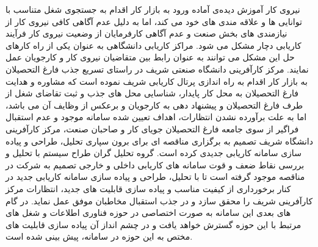 نیروی کار آموزش دیده‌ی آماده ورود به بازار کار اقدام به جستجوی شغل متناسب با توانایی ها و علاقه مندی های خود می کند، اما به دلیل عدم آگاهی کافی نیروی کار از نیازمندی های بخش صنعت و عدم آگاهی کارفرمایان از وضعیت نیروی کار فرآیند کاریابی دچار مشکل می شود. مراکز کاریابی دانشگاهی به عنوان یکی از راه کارهای حل این مشکل می توانند به عنوان رابط بین متقاضیان نیروی کار و کارجویان عمل نمایند. مرکز کارآفرینی دانشگاه صنعتی شریف در راستای تسریع جذب فارغ التحصیلان به بازار کار اقدام به راه اندازی پرتال کاریابی شریف نموده است که مشاوره و هدایت فارغ التحصیلان به محل کار پایدار، شناسایی محل های جذب و ثبت تقاضای شغل از طرف فارغ التحصیلان و پیشنهاد دهی به کارجویان و برعکس از وظایف آن می باشد، اما به علت برآورده نشدن انتظارات، اهداف تعیین شده سامانه موجود و عدم استقبال فراگیر از سوی جامعه فارغ التحصیلان جویای کار و صاحبان صنعت، مرکز کارآفرینی دانشگاه شریف تصمیم به برگزاری مناقصه ای برای برون سپاری تحلیل، طراحی و پیاده سازی سامانه کاریابی جدیدی کرده است.  گروه تحلیل گران طراح سیستم با تحلیل و بررسی نقاط ضعف و قوت سامانه های کاریابی داخلی و خارجی تصمیم به شرکت در مناقصه موجود گرفته است تا با تحلیل، طراحی و پیاده سازی سامانه کاریابی جدید در کنار برخورداری از کیفیت مناسب و پیاده سازی قابلیت های جدید، انتظارات مرکز کارآفرینی شریف را محقق سازد و در جذب استقبال مخاطبان موفق عمل نماید.  در گام های بعدی این سامانه به صورت اختصاصی در حوزه فناوری اطلاعات و شغل های مرتبط با این حوزه گسترش خواهد یافت و در چشم انداز آن پیاده سازی قابلیت های مختص به این حوزه در سامانه، پیش بینی شده است.
